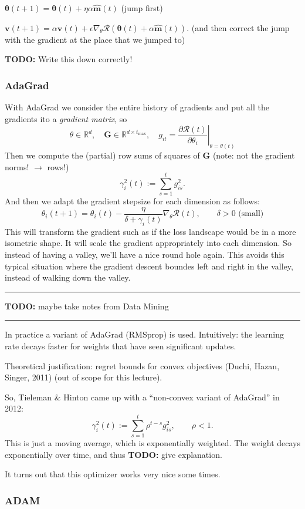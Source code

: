 \documentclass[a2paper,4pt]{extarticle}
\newcommand{\R}{\mathbb{R}}
\newcommand{\cR}{\mathcal{R}}
\newcommand{\mat}[1]{\mathbf{#1}}
\renewcommand{\vec}[1]{\mathbf{#1}}
\newcommand{\vv}{\vec{v}}
\newcommand{\vhm}{\widehat{\vec{m}}}
\newcommand{\vtheta}{\boldsymbol{\theta}}
\newcommand{\MG}{\mat{G}}
\newcommand{\evalat}[2]{\left. #1 \right|_{#2}}
\newcommand{\todo}[1]{\textbf{TODO:} #1}
\newcommand{\todo}[1]{%
}
\newcommand{\sep}{\vspace{0pt}\noindent\hrule\vspace{0pt}}
\newcommand{\sep}{\vspace{5pt}\noindent\hrule\vspace{5pt}}
\begin{document}
\begin{landscape}
\begin{multicols*}{7}
$
\vtheta(t+1)=\vtheta(t)+\eta\alpha\vhm(t)
$ (jump first)

$
\vv(t+1)=\alpha \vv(t) +
\epsilon\nabla_\theta\cR(\vtheta(t)+\alpha\vhm(t)).
$ (and then correct the jump with the gradient at the place that we jumped to)

\todo{Write this down correctly!}

\subsubsection{AdaGrad}

With AdaGrad we consider the entire history of gradients and put all the
gradients ito a \emph{gradient matrix}, so
\[
\theta\in\R^d,
\quad
\MG\in\R^{d\times t_{\max}},
\quad
g_{it}
=
\evalat{\frac{\partial \cR(t)}{\partial \theta_i}}{\theta=\theta(t)}
\]
Then we compute the (partial) row sums of squares of $\MG$ (note: not the
gradient norms! $\to$ rows!)
\[
\gamma_i^2(t):=\sum_{s=1}^tg_{is}^2.
\]
And then we adapt the gradient stepsize for each dimension as follows:
\[
\theta_i(t+1)=\theta_i(t)-\frac{\eta}{\delta+\gamma_i(t)}\nabla_\theta\cR(t),
\qquad
\delta>0\text{ (small)}
\]
This will transform the gradient such as if the loss landscape would be in a
more isometric shape. It will scale the gradient appropriately into each
dimension. So instead of having a valley, we'll have a nice round hole again.
This avoids this typical situation where the gradient descent boundes left and
right in the valley, instead of walking down the valley.

\sep

\todo{maybe take notes from Data Mining}

\sep

In practice a variant of AdaGrad (RMSprop) is used. Intuitively: the learning
rate decays faster for weights that have seen significant updates.

Theoretical justification: regret bounds for convex objectives (Duchi, Hazan,
Singer, 2011) (out of scope for this lecture).

So, Tieleman \& Hinton came up with a ``non-convex variant of AdaGrad'' in 2012:
\[
\gamma_i^2(t):=\sum_{s=1}^t\rho^{t-s}g_{is}^2,
\qquad
\rho<1.
\]
This is just a moving average, which is exponentially weighted. The weight
decays exponentially over time, and thus \todo{give explanation}.

It turns out that this optimizer works very nice some times.

\subsubsection{ADAM}


\end{multicols*}
\end{landscape}
\end{document}
